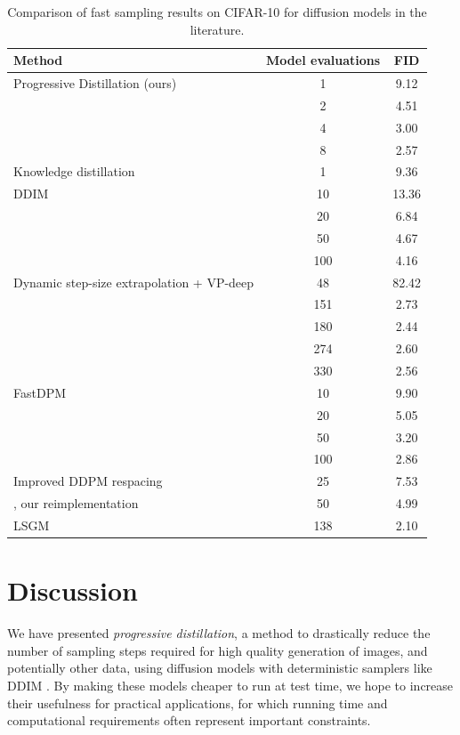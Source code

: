 \documentclass[hidelinks]{article} %
\begin{document}
\begin{table}[htb]
    \centering \small
    \begin{tabular}{lcc}
    Method & Model evaluations & FID \\
    \toprule
    Progressive Distillation (ours) & 1 & 9.12\\
                                    & 2 & 4.51\\
                                    & 4 & 3.00\\
                                    & 8 & 2.57\\
    \midrule
    Knowledge distillation~\citep{luhman2021knowledge} & 1 & 9.36 \\
    \midrule
    DDIM~\citep{song2020denoising}   & 10 & 13.36  \\ 
      & 20 & 6.84 \\
      & 50 & 4.67 \\
      & 100  & 4.16 \\
    \midrule
    Dynamic step-size extrapolation + VP-deep & 48 & 82.42 \\      
    \citep{jolicoeur2021gotta} & 151 & 2.73  \\
              & 180 & 2.44   \\
              & 274 & 2.60  \\
              & 330 & 2.56  \\
    \midrule
    FastDPM~\citep{kong2021fast} & 10 & 9.90  \\
       & 20 & 5.05 \\
       & 50 & 3.20 \\
       & 100 & 2.86 \\
    \midrule
    Improved DDPM respacing       & 25 & 7.53 \\  %
    \citep{nichol2021improvedddpm}, our reimplementation    & 50 & 4.99 \\
    \midrule
    LSGM~\citep{vahdat2021score} & 138 & 2.10 \\
    \bottomrule
    \end{tabular}
    \caption{Comparison of fast sampling results on CIFAR-10 for diffusion models in the literature.}
    \label{tab:other_fast}
\end{table}

\section{Discussion}
We have presented \emph{progressive distillation}, a method to drastically reduce the number of sampling steps required for high quality generation of images, and potentially other data, using diffusion models with deterministic samplers like DDIM \citep{song2020discriminator}. By making these models cheaper to run at test time, we hope to increase their usefulness for practical applications, for which running time and computational requirements often represent important constraints.
\end{document}
